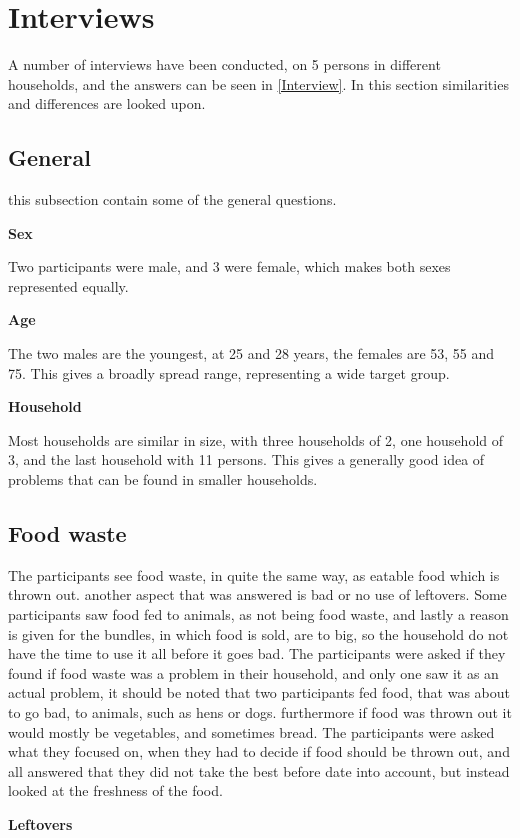 \section{Interviews}
A number of interviews have been conducted, on 5 persons in different households, and the answers can be seen in \cref{Interview}. In this section similarities and differences are looked upon.

\subsection{General}
this subsection contain some of the general questions.

\textbf{Sex}

Two participants were male, and 3 were female, which makes both sexes represented equally.

\textbf{Age}

The two males are the youngest, at 25 and 28 years, the females are 53, 55 and 75. This gives a broadly spread range, representing a wide target group.

\textbf{Household}

Most households are similar in size, with three households of 2, one household of 3, and the last household with 11 persons. This gives a generally good idea of problems that can be found in smaller households.
\subsection{Food waste}
The participants see food waste, in quite the same way, as eatable food which is thrown out. another aspect that was answered is bad or no use of leftovers. Some participants saw food fed to animals, as not being food waste, and lastly a reason is given for the bundles, in which food is sold, are to big, so the household do not have the time to use it all before it goes bad. The participants were asked if they found if food waste was a problem in their household, and only one saw it as an actual problem, it should be noted that two participants fed food, that was about to go bad,  to animals, such as hens or dogs. furthermore if food was thrown out it would mostly be vegetables, and sometimes bread. The participants were asked what they focused on, when they had to decide if food should be thrown out, and all answered that they did not take the best before date into account, but instead looked at the freshness of the food.

\textbf{Leftovers}

